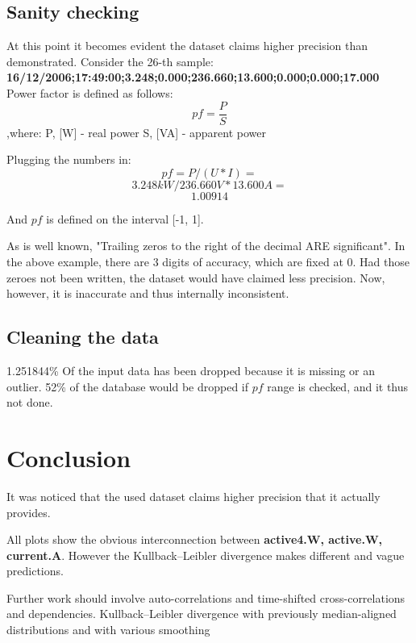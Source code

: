 \documentclass[11pt]{article}
\newcommand{\code}[1]{\textbf{#1}}
\newcommand{\para}[0]{\par\vspace{0.5cm}}
\begin{document}
\subsection{Sanity checking}
At this point it becomes evident the dataset claims higher precision than demonstrated.
Consider the 26-th sample: \code{16/12/2006;17:49:00;3.248;0.000;236.660;13.600;0.000;0.000;17.000}
Power factor is defined\cite{q6} as follows:
$$ {pf} = \frac{P}{S} $$
,where:  
P, [W] - real power  
S, [VA] - apparent power  

Plugging the numbers in:
$$ {pf} = P / (U * I) = $$
$$ 3.248kW / 236.660V * 13.600A = $$
$$ 1.00914 $$

And ${pf}$ is defined on the interval [-1, 1]\cite{q6}.
\para
As is well known,  "Trailing zeros to the right of the decimal ARE significant"\cite{q7}.
In the above example, there are 3 digits of accuracy, which are fixed at 0.
Had those zeroes not been written, the dataset would have claimed less precision.
Now, however, it is inaccurate and thus internally inconsistent.

\subsection{Cleaning the data}
1.251844\% Of the input data has been dropped because it is missing or an outlier.
52\% of the database would be dropped if ${pf}$ range is checked, and it thus not done.

\section{Conclusion}
It was noticed that the used dataset claims higher precision that it actually provides.
\para
All plots show the obvious interconnection between \code{active4.W, active.W, current.A}.
However the Kullback–Leibler divergence makes different and vague predictions.
\para
Further work should involve auto-correlations and time-shifted cross-correlations and dependencies.
Kullback–Leibler divergence with previously median-aligned distributions and with various smoothing
\end{document}
